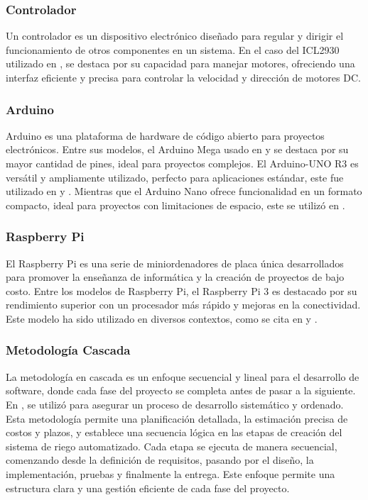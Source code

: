 \subsubsection{Controlador}
Un controlador es un dispositivo electrónico diseñado para regular y dirigir el funcionamiento de otros componentes en un sistema. En el caso del ICL2930 utilizado en \cite{hasan_implementation_2018}, se destaca por su capacidad para manejar motores, ofreciendo una interfaz eficiente y precisa para controlar la velocidad y dirección de motores DC.

\subsubsection*{Arduino}
Arduino es una plataforma de hardware de código abierto para proyectos electrónicos. Entre sus modelos, el Arduino Mega usado en \cite{lema_holguin_implementacion_2018} \cite{alcivar_dominguez_sistema_2018} y \cite{hasan_implementation_2018} se destaca por su mayor cantidad de pines, ideal para proyectos complejos. El Arduino-UNO R3 es versátil y ampliamente utilizado, perfecto para aplicaciones estándar, este fue utilizado en \cite{haiyan_intelligent_2022} y \cite{mohammed_intelligent_nodate} . Mientras que el Arduino Nano ofrece funcionalidad en un formato compacto, ideal para proyectos con limitaciones de espacio, este se utilizó en \cite{benyezza_zoning_2021}.

\subsubsection*{Raspberry Pi}
El Raspberry Pi es una serie de miniordenadores de placa única desarrollados para promover la enseñanza de informática y la creación de proyectos de bajo costo. Entre los modelos de Raspberry Pi, el Raspberry Pi 3 es destacado por su rendimiento superior con un procesador más rápido y mejoras en la conectividad. Este modelo ha sido utilizado en diversos contextos, como se cita en \cite{benyezza_zoning_2021} y \cite{orozco_jaramillo_diseno_2019}.

\subsubsection{Metodología Cascada}
La metodología en cascada es un enfoque secuencial y lineal para el desarrollo de software, donde cada fase del proyecto se completa antes de pasar a la siguiente. En \cite{alcivar_dominguez_sistema_2018}, se utilizó para asegurar un proceso de desarrollo sistemático y ordenado. Esta metodología permite una planificación detallada, la estimación precisa de costos y plazos, y establece una secuencia lógica en las etapas de creación del sistema de riego automatizado. Cada etapa se ejecuta de manera secuencial, comenzando desde la definición de requisitos, pasando por el diseño, la implementación, pruebas y finalmente la entrega. Este enfoque permite una estructura clara y una gestión eficiente de cada fase del proyecto.


